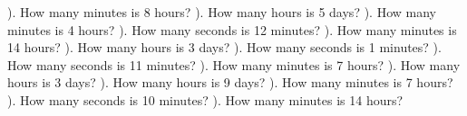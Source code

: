 \documentclass{article}%
\begin{document}
). How many minutes is 8 hours?%
\newline%
\newline%
). How many hours is 5 days?%
\newline%
\newline%
). How many minutes is 4 hours?%
\newline%
\newline%
). How many seconds is 12 minutes?%
\newline%
\newline%
). How many minutes is 14 hours?%
\newline%
\newline%
). How many hours is 3 days?%
\newline%
\newline%
). How many seconds is 1 minutes?%
\newline%
\newline%
). How many seconds is 11 minutes?%
\newline%
\newline%
). How many minutes is 7 hours?%
\newline%
\newline%
). How many hours is 3 days?%
\newline%
\newline%
). How many hours is 9 days?%
\newline%
\newline%
). How many minutes is 7 hours?%
\newline%
\newline%
). How many seconds is 10 minutes?%
\newline%
\newline%
). How many minutes is 14 hours?%
\newline%
\newline%
\newline%
\end{document}
